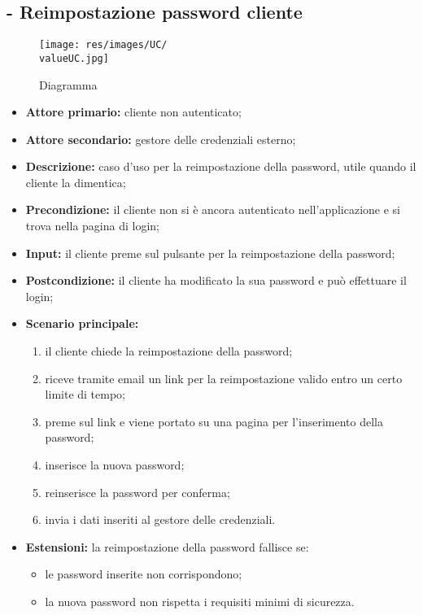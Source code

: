 \stepUserCase
\subsection{ - Reimpostazione password cliente}
\begin{figure}[H]
    \centering
    \texttt{[image: res/images/UC/\\valueUC.jpg]}
    \caption{Diagramma }
\end{figure}
\begin{itemize}
    \item \textbf{Attore primario:} cliente non autenticato;
    \item \textbf{Attore secondario:} gestore delle credenziali esterno;
    \item \textbf{Descrizione:} caso d'uso per la reimpostazione della password, utile quando il cliente la dimentica;
    \item \textbf{Precondizione:} il cliente non si è ancora autenticato nell'applicazione e si trova nella pagina di login;
    \item \textbf{Input:} il cliente preme sul pulsante per la reimpostazione della password;
    \item \textbf{Postcondizione:} il cliente ha modificato la sua password e può effettuare il login;
    \item \textbf{Scenario principale:}
          \begin{enumerate}
              \item il cliente chiede la reimpostazione della password;
              \item riceve tramite email un link per la reimpostazione valido entro un certo limite di tempo;
              \item preme sul link e viene portato su una pagina per l'inserimento della password;
              \item inserisce la nuova password;
              \item reinserisce la password per conferma;
              \item invia i dati inseriti al gestore delle credenziali.
          \end{enumerate}
    \item \textbf{Estensioni:} la reimpostazione della password fallisce se:
          \begin{itemize}
              \item le password inserite non corrispondono;
              \item la nuova password non rispetta i requisiti minimi di sicurezza.
          \end{itemize}
\end{itemize}

